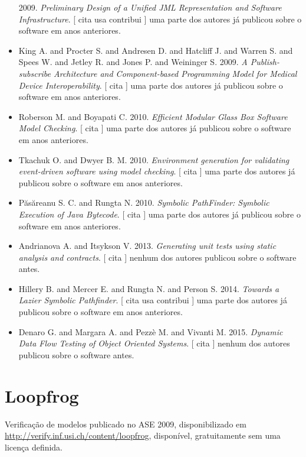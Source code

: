 \begin{itemize}
      2009.
        \textit{ Preliminary Design of a Unified JML Representation and Software Infrastructure}.
      [
          cita
          usa
          contribui
      ]
uma parte dos autores já publicou sobre o software em anos anteriores.
\item King A. and Procter S. and Andresen D. and Hatcliff J. and Warren S. and Spees W. and Jetley R. and Jones P. and Weininger S.
      2009.
        \textit{ A Publish-subscribe Architecture and Component-based Programming Model for Medical Device Interoperability}.
      [
          cita
      ]
uma parte dos autores já publicou sobre o software em anos anteriores.
\item Roberson M. and Boyapati C.
      2010.
        \textit{ Efficient Modular Glass Box Software Model Checking}.
      [
          cita
      ]
uma parte dos autores já publicou sobre o software em anos anteriores.
\item Tkachuk O. and Dwyer B. M.
      2010.
        \textit{ Environment generation for validating event-driven software using model checking}.
      [
          cita
      ]
uma parte dos autores já publicou sobre o software em anos anteriores.
\item P\u{a}s\u{a}reanu S. C. and Rungta N.
      2010.
        \textit{ Symbolic PathFinder: Symbolic Execution of Java Bytecode}.
      [
          cita
      ]
uma parte dos autores já publicou sobre o software em anos anteriores.
\item Andrianova A. and Itsykson V.
      2013.
        \textit{ Generating unit tests using static analysis and contracts}.
      [
          cita
      ]
nenhum dos autores publicou sobre o software antes.
\item Hillery B. and Mercer E. and Rungta N. and Person S.
      2014.
        \textit{ Towards a Lazier Symbolic Pathfinder}.
      [
          cita
          usa
          contribui
      ]
uma parte dos autores já publicou sobre o software em anos anteriores.
\item Denaro G. and Margara A. and Pezz\`{e} M. and Vivanti M.
      2015.
        \textit{ Dynamic Data Flow Testing of Object Oriented Systems}.
      [
          cita
      ]
nenhum dos autores publicou sobre o software antes.
\end{itemize}
\section{Loopfrog}

Verificação de modelos
publicado no ASE 2009,
disponibilizado em \url{http://verify.inf.usi.ch/content/loopfrog},
disponível,
gratuitamente
sem uma licença definida.

